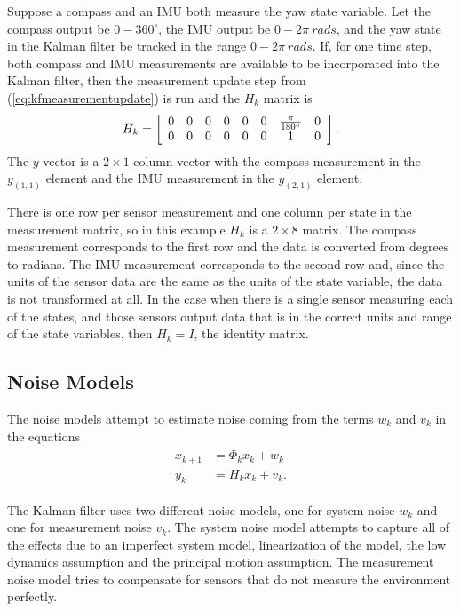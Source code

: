 Suppose a compass and an IMU both measure the yaw state variable. Let the compass output be $0 - 360^\circ$, the IMU output be $0 - 2\pi~rads$, and the yaw state in the Kalman filter be tracked in the range $0 - 2\pi ~ rads$. If, for one time step, both compass and IMU measurements are available to be incorporated into the Kalman filter, then the measurement update step from (\ref{eq:kfmeasurementupdate}) is run and the $H_k$ matrix is
\begin{align*}
H_k = \left[\begin{array}{c c c c c c c c}
0 & 0 & 0 & 0 & 0 & 0 & \frac{\pi}{180^\circ} & 0 \\
0 & 0 & 0 & 0 & 0 & 0 & 1 & 0
\end{array}\right].
\end{align*}
The $y$ vector is a $2\times1$ column vector with the compass measurement in the $y_{(1,1)}$ element and the IMU measurement in the $y_{(2,1)}$ element.

There is one row per sensor measurement and one column per state in the measurement matrix, so in this example $H_k$ is a $2\times8$ matrix. The compass measurement corresponds to the first row and the data is converted from degrees to radians. The IMU measurement corresponds to the second row and, since the units of the sensor data are the same as the units of the state variable, the data is not transformed at all. In the case when there is a single sensor measuring each of the states, and those sensors output data that is in the correct units and range of the state variables, then $H_k=I$, the identity matrix.

\subsection{Noise Models}
\label{sec:kfNoiseModels}
The noise models attempt to estimate noise coming from the terms $w_k$ and $v_k$ in the equations
\begin{align*}
\begin{split}
x_{k+1} &= \Phi_kx_k + w_k \\
y_k &= H_kx_k + v_k.
\end{split}
\end{align*}

The Kalman filter uses two different noise models, one for system noise $w_k$ and one for measurement noise $v_k$. The system noise model attempts to capture all of the effects due to an imperfect system model, linearization of the model, the low dynamics assumption and the principal motion assumption. The measurement noise model tries to compensate for sensors that do not measure the environment perfectly.

